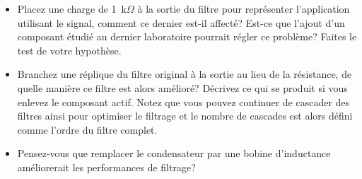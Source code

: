 \documentclass[canadien,12pt,oneside,letterpaper]{article}
\begin{document}
\begin{itemize}
    \item Placez une charge de 1~k$\Omega$ à la sortie du filtre pour représenter l'application utilisant le signal, comment ce dernier est-il affecté? Est-ce que l'ajout d'un composant étudié au dernier laboratoire pourrait régler ce problème? Faites le test de votre hypothèse. 
    \item Branchez une réplique du filtre original à la sortie au lieu de la résistance, de quelle manière ce filtre est alors amélioré? Décrivez ce qui se produit si vous enlevez le composant actif. Notez que vous pouvez continuer de cascader des filtres ainsi pour optimiser le filtrage et le nombre de cascades est alors défini comme l'ordre du filtre complet.  %
    \item Pensez-vous que remplacer le condensateur par une bobine d'inductance améliorerait les performances de filtrage? %
\end{itemize}
\end{document}

